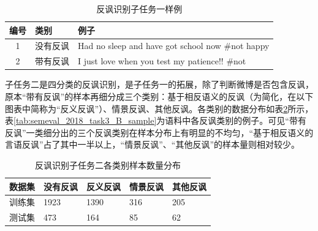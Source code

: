 \begin{table}[htb]
  \centering
  \begin{minipage}[t]{0.8\linewidth} %
  \caption{反讽识别子任务一样例}
  \label{tab:semeval_2018_task3_A_sample}
  \begin{tabularx}{\linewidth}{c|l|X}
    \toprule[1.5pt]
    编号 & 类别 & 例子 \\
    \hline
    1 & 没有反讽 & Had no sleep and have got school now \#not happy \\
    2 & 带有反讽 & I just love when you test my patience!! \#not \\
    \bottomrule[1.5pt]
  \end{tabularx}
  \end{minipage}
\end{table}

子任务二是四分类的反讽识别，是子任务一的拓展，除了判断微博是否包含反讽，原本“带有反讽”的样本再细分成三个类别：基于相反语义的反讽（为简化，在以下图表中简称为“反义反讽”）、情景反讽、其他反讽。各类别的数据分布如表\ref{tab:semeval_2018_task3_B_data}所示，表\ref{tab:semeval_2018_task3_B_sample}为语料中各反讽类别的例子。可见“带有反讽”一类细分出的三个反讽类别在样本分布上有明显的不均匀，“基于相反语义的言语反讽”占了其中一半以上，“情景反讽”、“其他反讽”的样本量则相对较少。

\begin{table}[htb]
  \centering
  \begin{minipage}[t]{\linewidth} %
  \caption{反讽识别子任务二各类别样本数量分布}
  \label{tab:semeval_2018_task3_B_data}
    \begin{tabularx}{\linewidth}{X|XXXX}
    \toprule[1.5pt]
    数据集 & 没有反讽 & 反义反讽 & 情景反讽 & 其他反讽\\  
    \hline
    训练集 & 1923 & 1390 & 316  & 205 \\
    测试集 & 473  & 164  & 85  & 62 \\
    \bottomrule[1.5pt]
    \end{tabularx}
  \end{minipage}
\end{table}

